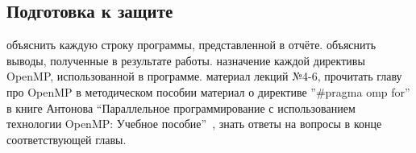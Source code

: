 \subsection{Подготовка к защите}
\begin{enumerate}
     объяснить каждую строку программы, представленной в отчёте.
     объяснить выводы, полученные в результате работы.
     назначение каждой директивы OpenMP, использованной в программе.
     материал лекций №4-6, прочитать главу про OpenMP в методическом пособии
     материал о директиве ''\#pragma omp for'' в книге Антонова ``Параллельное программирование с использованием технологии OpenMP: Учебное пособие''~\cite{AntonovOpenMP2004}, знать ответы на вопросы в конце соответствующей главы.
\end{enumerate}
